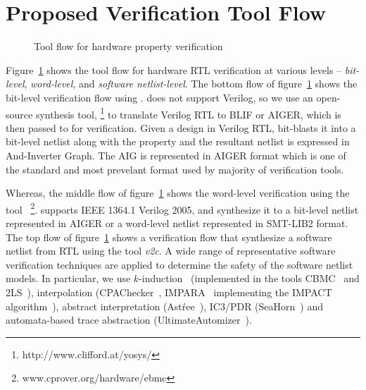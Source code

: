 \section{Proposed Verification Tool Flow}
%
\begin{figure}[t]
\centering
\vspace*{0.3cm}
\caption{Tool flow for hardware property verification\label{fig:toolflow}}
\end{figure}
%
%
Figure~\ref{fig:toolflow} shows the tool flow for hardware RTL 
verification at various levels -- 
\emph{bit-level}, \emph{word-level}, and \emph{software netlist-level}.  
The bottom flow of figure~\ref{fig:toolflow} shows the bit-level 
verification flow using \ABC.
\ABC does not support Verilog, so we use an open-source synthesis tool,
\yosys\footnote{http://www.clifford.at/yosys/} to translate Verilog
RTL to BLIF or AIGER, which is then passed to \ABC for verification. 
Given a design in Verilog RTL, \yosys bit-blasts it into a bit-level netlist 
along with the property and the resultant netlist is expressed in And-Inverter 
Graph.  The AIG is represented in AIGER format which is one of the standard 
and most prevelant format used by majority of verification tools.


Whereas, the middle flow of figure~\ref{fig:toolflow} shows the 
word-level verification using the tool 
\ebmc~\footnote{\scriptsize{www.cprover.org/hardware/ebmc}}. 
\ebmc supports IEEE 1364.1 Verilog 2005, and synthesize it to a bit-level 
netlist represented in AIGER or a word-level netlist represented in 
SMT-LIB2 format.  The top flow of figure~\ref{fig:toolflow} shows a
verification flow that synthesize a software netlist from RTL using 
the tool \emph{v2c}.  A wide range of representative software 
verification techniques are applied to determine the safety of the
software netlist models. In particular, we use $k$-induction~\cite{SSS00}
(implemented in the tools CBMC~\cite{cbmc.tacas:2004} and
2LS~\cite{kiki}), interpolation
(CPAChecker~\cite{DBLP:conf/cav/BeyerK11}, IMPARA~\cite{impara}
implementing the IMPACT algorithm~\cite{ken}), abstract interpretation
(Ast{\'r}ee~\cite{DBLP:conf/esop/CousotCFMMMR05}), IC3/PDR
(SeaHorn~\cite{DBLP:conf/cav/GurfinkelKKN15}) and automata-based 
trace abstraction (UltimateAutomizer~\cite{DBLP:conf/tacas/HeizmannDGLMSP16}).
%
